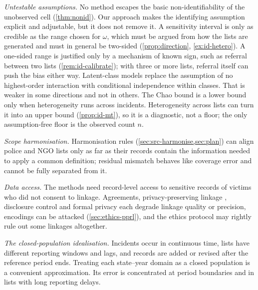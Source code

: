 \emph{Untestable assumptions.} No method escapes the basic
non-identifiability of the unobserved cell (\cref{thm:nonid}). Our approach
makes the identifying assumption explicit and adjustable, but it does not
remove it. A sensitivity interval is only as credible as the range chosen
for $\omega$, which must be argued from how the lists are generated and must
in general be two-sided (\cref{prop:direction}, \cref{ex:id-hetero}). A one-sided
range is justified only by a mechanism of known sign, such as referral
between two lists (\cref{rem:id-calibrate}); with three or more lists,
referral itself can push the bias either way. Latent-class models replace the
assumption of no highest-order interaction with conditional independence
within classes. That is weaker in some directions and not in others. The
Chao bound is a lower bound only when heterogeneity runs across incidents.
Heterogeneity across lists can turn it into an upper bound
(\cref{prop:id-mt}), so it is a diagnostic, not a floor; the only
assumption-free floor is the observed count $n$.

\emph{Scope harmonisation.} Harmonisation rules
(\cref{sec:src-harmonise,sec:plan}) can align police and NGO lists only as
far as their records contain the information needed to apply a common
definition; residual mismatch behaves like coverage error and cannot be
fully separated from it.

\emph{Data access.} The methods need record-level access to sensitive
records of victims who did not consent to linkage. Agreements,
privacy-preserving linkage \citep{schnell2009}, disclosure control
\citep{hundepool2012} and formal privacy \citep{dwork2014} each degrade
linkage quality or precision, encodings can be attacked
(\cref{sec:ethics-pprl}), and the ethics protocol may rightly rule out some
linkages altogether.

\emph{The closed-population idealisation.} Incidents occur in continuous
time, lists have different reporting windows and lags, and records are
added or revised after the reference period ends. Treating each state--year
domain as a closed population is a convenient approximation. Its error is
concentrated at period boundaries and in lists with long reporting delays.

